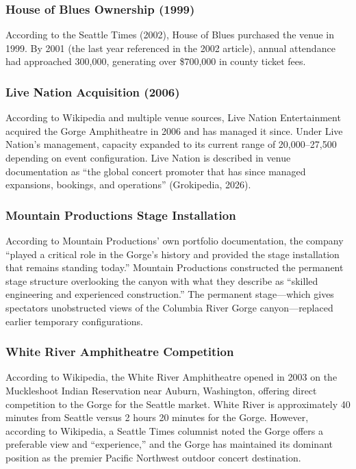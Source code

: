 \documentclass[11pt,letterpaper]{article}
\begin{document}
\subsubsection{House of Blues Ownership (1999)}

According to the Seattle Times (2002), House of Blues purchased the venue in 1999. By 2001 (the last year referenced in the 2002 article), annual attendance had approached 300,000, generating over \$700,000 in county ticket fees.

\subsubsection{Live Nation Acquisition (2006)}

According to Wikipedia and multiple venue sources, Live Nation Entertainment acquired the Gorge Amphitheatre in 2006 and has managed it since. Under Live Nation's management, capacity expanded to its current range of 20,000--27,500 depending on event configuration. Live Nation is described in venue documentation as ``the global concert promoter that has since managed expansions, bookings, and operations'' (Grokipedia, 2026).

\subsubsection{Mountain Productions Stage Installation}

According to Mountain Productions' own portfolio documentation, the company ``played a critical role in the Gorge's history and provided the stage installation that remains standing today.'' Mountain Productions constructed the permanent stage structure overlooking the canyon with what they describe as ``skilled engineering and experienced construction.'' The permanent stage---which gives spectators unobstructed views of the Columbia River Gorge canyon---replaced earlier temporary configurations.

\subsubsection{White River Amphitheatre Competition}

According to Wikipedia, the White River Amphitheatre opened in 2003 on the Muckleshoot Indian Reservation near Auburn, Washington, offering direct competition to the Gorge for the Seattle market. White River is approximately 40 minutes from Seattle versus 2 hours 20 minutes for the Gorge. However, according to Wikipedia, a Seattle Times columnist noted the Gorge offers a preferable view and ``experience,'' and the Gorge has maintained its dominant position as the premier Pacific Northwest outdoor concert destination.
\end{document}
